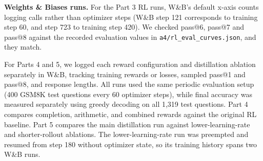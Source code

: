 \documentclass[10pt]{article}
\newcommand{\code}[1]{\texttt{#1}}
\begin{document}
\textbf{Weights \& Biases runs.} For the Part 3 RL runs, W\&B's default x-axis counts logging calls rather than optimizer steps (W\&B step 121 corresponds to training step 60, and step 723 to training step 420). We checked pass@6, pass@7 and pass@8 against the recorded evaluation values in \code{a4/rl\_eval\_curves.json},
and they match.

For Parts 4 and 5, we logged each reward configuration and
distillation ablation separately in W\&B, tracking training
rewards or losses, sampled pass@1 and pass@8, and response
lengths. All runs used the same periodic evaluation setup
(400 GSM8K test questions every 60 optimizer steps), while
final accuracy was measured separately using greedy decoding
on all 1,319 test questions. Part 4 compares completion,
arithmetic, and combined rewards against the original RL
baseline. Part 5 compares the main distillation run against
lower-learning-rate and shorter-rollout ablations. The
lower-learning-rate run was preempted and resumed from step
180 without optimizer state, so its training history spans
two W\&B runs.
\end{document}
